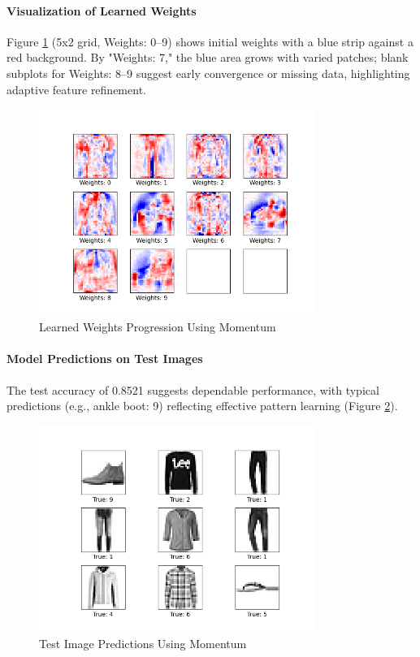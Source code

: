 \documentclass{article}
\begin{document}
\paragraph{Visualization of Learned Weights}

Figure \ref{fig:momentum_weights} (5x2 grid, Weights: 0–9) shows initial weights with a blue strip against a red background. By "Weights: 7," the blue area grows with varied patches; blank subplots for Weights: 8–9 suggest early convergence or missing data, highlighting adaptive feature refinement.

\begin{figure}[H]
    \centering
    \includegraphics[width=0.8\textwidth]{assets/q2/momentum/weights_50_epochs.png}
    \caption{Learned Weights Progression Using Momentum}
    \label{fig:momentum_weights}
\end{figure}

\paragraph{Model Predictions on Test Images}

The test accuracy of 0.8521 suggests dependable performance, with typical predictions (e.g., ankle boot: 9) reflecting effective pattern learning (Figure \ref{fig:momentum_images}).

\begin{figure}[H]
    \centering
    \includegraphics[width=0.8\textwidth]{assets/q2/momentum/images_50_epochs.png}
    \caption{Test Image Predictions Using Momentum}
    \label{fig:momentum_images}
\end{figure}
\end{document}
